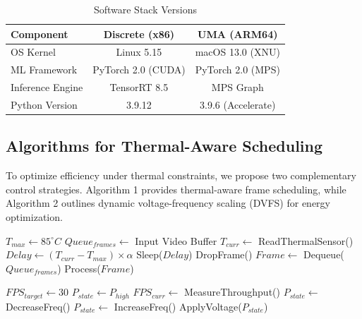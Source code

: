 \documentclass[conference]{IEEEtran}
\begin{document}
\begin{table}[htbp]
\caption{Software Stack Versions}
\begin{center}
\begin{tabular}{lcc}
\toprule
\textbf{Component} & \textbf{Discrete (x86)} & \textbf{UMA (ARM64)} \\
\midrule
OS Kernel & Linux 5.15 & macOS 13.0 (XNU) \\
ML Framework & PyTorch 2.0 (CUDA) & PyTorch 2.0 (MPS) \\
Inference Engine & TensorRT 8.5 & MPS Graph \\
Python Version & 3.9.12 & 3.9.6 (Accelerate) \\
\bottomrule
\end{tabular}
\end{center}
\label{tab:software}
\end{table}

\subsection{Algorithms for Thermal-Aware Scheduling}
To optimize efficiency under thermal constraints, we propose two complementary control strategies. Algorithm 1 provides thermal-aware frame scheduling, while Algorithm 2 outlines dynamic voltage-frequency scaling (DVFS) for energy optimization.

\begin{algorithm}
\caption{Proposed Thermal-Aware Inference Scheduling}
\begin{algorithmic}[1]
\REQUIRE $T_{max} \gets 85^\circ C$
\REQUIRE $Queue_{frames} \gets$ Input Video Buffer
    \STATE $T_{curr} \gets$ ReadThermalSensor()
        \STATE $Delay \gets (T_{curr} - T_{max}) \times \alpha$
        \STATE Sleep($Delay$)
        \STATE DropFrame() 
    \ELSE
        \STATE $Frame \gets$ Dequeue($Queue_{frames}$)
        \STATE Process($Frame$)
    \ENDIF
\ENDWHILE
\end{algorithmic}
\label{alg:thermal}
\end{algorithm}

\begin{algorithm}
\caption{Proposed Dynamic Voltage Frequency Scaling}
\begin{algorithmic}[1]
\REQUIRE $FPS_{target} \gets 30$
\REQUIRE $P_{state} \gets P_{high}$
    \STATE $FPS_{curr} \gets$ MeasureThroughput()
        \STATE $P_{state} \gets$ DecreaseFreq()
        \STATE $P_{state} \gets$ IncreaseFreq()
    \ENDIF
    \STATE ApplyVoltage($P_{state}$)
\ENDWHILE
\end{algorithmic}
\label{alg:dvfs}
\end{algorithm}
\end{document}
